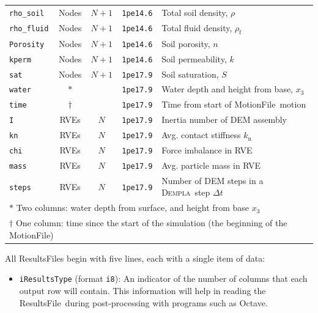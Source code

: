 \documentclass[letterpaper,11pt]{article}
\newcommand{\Dempla}{\textsc{Dempla}}
\newcommand{\MotionFile}{\textsf{MotionFile}}
\newcommand{\ResultsFile}{\textsf{ResultsFile}}
\begin{document}
\begin{itemize}
\begin{table}
\begin{tabular}{lcccp{5cm}}
      \texttt{rho\_soil} & Nodes & $N+1$ & \texttt{1pe14.6} &
        Total soil density, $\rho$\\
      \texttt{rho\_fluid} & Nodes & $N+1$ & \texttt{1pe14.6} &
        Total fluid density, $\rho_{\text{f}}$\\
      \texttt{Porosity} & Nodes & $N+1$ & \texttt{1pe14.6} &
        Soil porosity, $n$\\
      \texttt{kperm} & Nodes & $N+1$ & \texttt{1pe14.6} &
        Soil permeability, $k$\\
      \texttt{sat} & Nodes & $N+1$ & \texttt{1pe17.9} &
        Soil saturation, $S$\\
      \texttt{water}& $\ast$ & & \texttt{1pe17.9} &
        Water depth and height from base, $x_{3}$\\
      \texttt{time} & $\dagger$ & & \texttt{1pe17.9} &
        Time from start of \MotionFile\ motion\\
      \texttt{I} & RVEs & $N$ & \texttt{1pe17.9} &
        Inertia number of DEM assembly\\
      \texttt{kn} & RVEs & $N$ & \texttt{1pe17.9} &
        Avg. contact stiffness $k_\text{n}$\\
      \texttt{chi} & RVEs & $N$ & \texttt{1pe17.9} &
        Force imbalance in RVE\\
      \texttt{mass} & RVEs & $N$ & \texttt{1pe17.9} &
        Avg. particle mass in RVE\\
      \texttt{steps} & RVEs & $N$ & \texttt{1pe17.9} &
        Number of DEM steps in a \Dempla\ step $\Delta t$\\
      \hline
      \multicolumn{5}{l}{%
        $\ast$ Two columns: water depth from surface,
        and height from base $x_{3}$} \\
      \multicolumn{5}{l}{%
        $\dagger$ One column: time since the start of the
        simulation (the beginning of the \MotionFile )} \\
      \hline
    \end{tabular}
  \end{table}
%
  All \ResultsFile s begin with five lines, each with a single
  item of data:
%
  \begin{itemize}
    \item
      \texttt{iResultsType} (format \texttt{i8}):
      An indicator of the number of columns that
      each output row will contain.
      This information will help in reading the
      \ResultsFile\ during post-processing with
      programs such as Octave.
      \begin{itemize}

\end{itemize}
\end{itemize}
\end{itemize}
\end{document}
